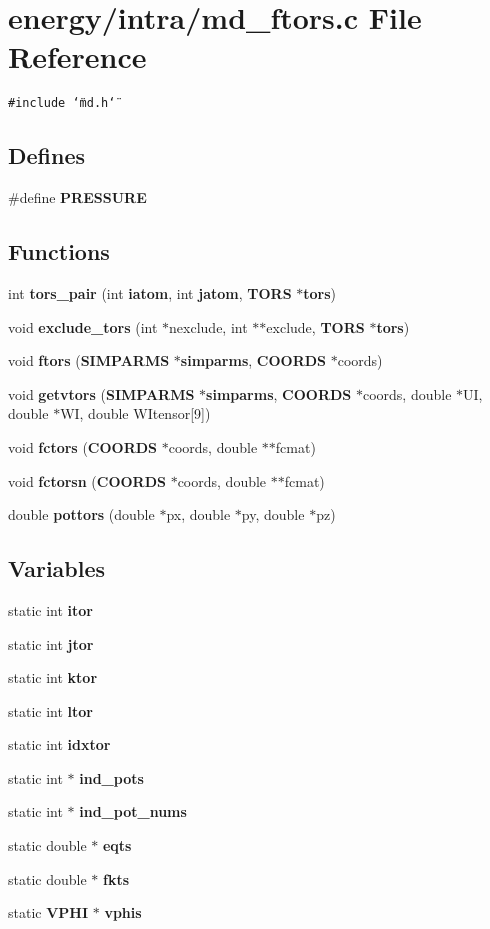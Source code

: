 \section{energy/intra/md\_\-ftors.c File Reference}
\label{md__ftors_8c}
{\tt \#include \char`\"{}md.h\char`\"{}}\par
\subsection*{Defines}
\begin{CompactItemize}
\item 
\#define {\bf PRESSURE}
\end{CompactItemize}
\subsection*{Functions}
\begin{CompactItemize}
\item 
int {\bf tors\_\-pair} (int {\bf iatom}, int {\bf jatom}, {\bf TORS} $\ast${\bf tors})
\item 
void {\bf exclude\_\-tors} (int $\ast$nexclude, int $\ast$$\ast$exclude, {\bf TORS} $\ast${\bf tors})
\item 
void {\bf ftors} ({\bf SIMPARMS} $\ast${\bf simparms}, {\bf COORDS} $\ast$coords)
\item 
void {\bf getvtors} ({\bf SIMPARMS} $\ast${\bf simparms}, {\bf COORDS} $\ast$coords, double $\ast$UI, double $\ast$WI, double WItensor[9])
\item 
void {\bf fctors} ({\bf COORDS} $\ast$coords, double $\ast$$\ast$fcmat)
\item 
void {\bf fctorsn} ({\bf COORDS} $\ast$coords, double $\ast$$\ast$fcmat)
\item 
double {\bf pottors} (double $\ast$px, double $\ast$py, double $\ast$pz)
\end{CompactItemize}
\subsection*{Variables}
\begin{CompactItemize}
\item 
static int {\bf itor}
\item 
static int {\bf jtor}
\item 
static int {\bf ktor}
\item 
static int {\bf ltor}
\item 
static int {\bf idxtor}
\item 
static int $\ast$ {\bf ind\_\-pots}
\item 
static int $\ast$ {\bf ind\_\-pot\_\-nums}
\item 
static double $\ast$ {\bf eqts}
\item 
static double $\ast$ {\bf fkts}
\item 
static {\bf VPHI} $\ast$ {\bf vphis}
\end{CompactItemize}


